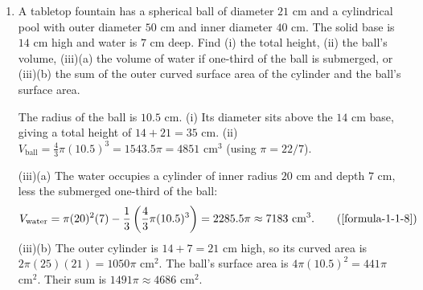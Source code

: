 \begin{enumerate}[label={},leftmargin=1.15cm,labelwidth=1.0cm,labelsep=0.15cm,itemindent=0pt,listparindent=0pt,parsep=0pt,topsep=0pt]
\item[3.1.38] A tabletop fountain has a spherical ball of diameter $21$ cm and a cylindrical pool with outer diameter $50$ cm and inner diameter $40$ cm. The solid base is $14$ cm high and water is $7$ cm deep. Find (i) the total height, (ii) the ball's volume, (iii)(a) the volume of water if one-third of the ball is submerged, or (iii)(b) the sum of the outer curved surface area of the cylinder and the ball's surface area.

\vspace{0.6em}\par\solution


The radius of the ball is $10.5$ cm. (i) Its diameter sits above the $14$ cm base, giving a total height of $14+21=35$ cm. (ii) $V_{\text{ball}}=\frac43\pi(10.5)^3=1543.5\pi=4851$ cm$^3$ (using $\pi=22/7$).

(iii)(a) The water occupies a cylinder of inner radius $20$ cm and depth $7$ cm, less the submerged one-third of the ball:
\begin{equation*}
V_{\text{water}}=\pi(20)^2(7)-\frac13\left(\frac43\pi(10.5)^3\right)=2285.5\pi\approx7183\text{ cm}^3.
\tag*{(\ref{formula-1-1-8})}\end{equation*}
(iii)(b) The outer cylinder is $14+7=21$ cm high, so its curved area is $2\pi(25)(21)=1050\pi$ cm$^2$. The ball's surface area is $4\pi(10.5)^2=441\pi$ cm$^2$. Their sum is $1491\pi\approx4686$ cm$^2$.
\end{enumerate}